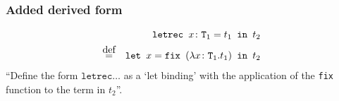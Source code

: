 \subsubsection{Added derived form \cite{pierce2002ProgLang}}
\begin{equation*}
    \begin{split}
        \texttt{letrec } x \colon \texttt{T}_1 = t_1 \texttt{ in } t_2 \\
        \defeq \quad \texttt{let } x = \texttt{fix } (\lambda x \colon \texttt{T}_1 . t_1) \texttt{ in } t_2
    \end{split}
\end{equation*}
``Define the form $\texttt{letrec} \dots$ as a `let binding' with the application of
the \texttt{fix} function to the term in $t_2$''.
